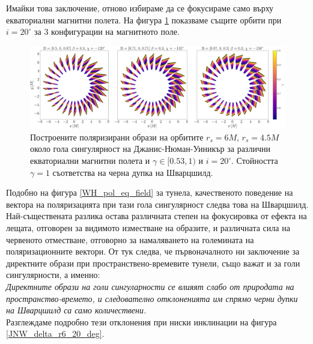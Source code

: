 Имайки това заключение, отново избираме да се фокусираме само върху екваториални магнитни полета. На фигура \ref{JNW_pol_eq_field} показваме същите орбити при $i = 20^\circ$ за 3 конфигурации на магнитното поле.\\

\begin{figure}[!htb]
	\centering
	\includegraphics[scale = 0.16]{JNW_alpha_Eq_Field.png}
	\caption[Поляризирани образи около гола сингулярност на Джанис-Нюман-Уиникър за различни екваториални магнитни полета.]{\small Построените поляризирани образи на орбитите $r_s = 6M$, $r_s = 4.5M$ около гола сингулярност на Джанис-Нюман-Уиникър за различни екваториални магнитни полета и $\gamma \in[0.53,1)$ и $i = 20^\circ$. Стойността $\gamma = 1$ съответства на черна дупка на Шварцшилд.} 
	\label{JNW_pol_eq_field}
\end{figure}

Подобно на фигура \ref{WH_pol_eq_field} за  тунела, качественото поведение на вектора на поляризацията при тази гола сингулярност следва това на Шварцшилд. Най-съществената разлика остава различната степен на фокусировка от ефекта на лещата, отговорен за видимото изместване на образите, и различната сила на червеното отместване, отговорно за намаляването на големината на поляризационните вектори. От тук следва, че първоначалното ни заключение за директните образи при пространствено-времевите тунели, също важат и за голи сингулярности, а именно:\\

\emph{Директните образи на голи сингуларности се влияят слабо от природата на пространство-времето, и следователно отклоненията им спрямо черни дупки на Шварцшилд са само количествени.}\\

Разглеждаме подробно тези отклонения при ниски инклинации на фигура \ref{JNW_delta_r6_20_deg}.

